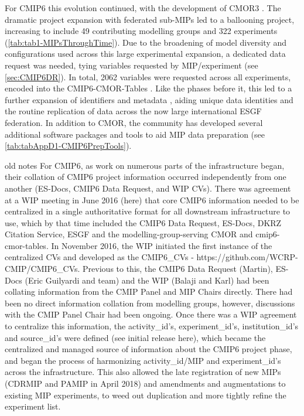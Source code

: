 \documentclass[gmd, preprint]{copernicus}
\begin{document}
{For CMIP6 this evolution continued, with the development of CMOR3 \citep{mauzey_cmor_2024}. The dramatic project expansion with federated sub-MIPs led to a ballooning project, increasing to include 49 contributing modelling groups and 322 experiments (\autoref{tab:tab1-MIPsThroughTime}). Due to the broadening of model diversity and configurations used across this large experimental expansion, a dedicated data request was needed, tying variables requested by MIP/experiment (see \autoref{sec:CMIP6DR}). In total, 2062 variables were requested across all experiments, encoded into the CMIP6-CMOR-Tables \citep{nadeau_cmip6_2017}. Like the phases before it, this led to a further expansion of identifiers and metadata \citep{taylor_pcmdi_2018}, aiding unique data identities and the routine replication of data across the now large international ESGF federation. In addition to CMOR, the community has developed several additional software packages and tools to aid MIP data preparation (see \autoref{tab:tabAppD1-CMIP6PrepTools}).

old notes
For CMIP6, as work on numerous parts of the infrastructure began, their collation of CMIP6 project information occurred independently from one another (ES-Docs, CMIP6 Data Request, and WIP CVs). There was agreement at a WIP meeting in June 2016 (here) that core CMIP6 information needed to be centralized in a single authoritative format for all downstream infrastructure to use, which by that time included the CMIP6 Data Request, ES-Docs, DKRZ Citation Service, ESGF and the modelling-group-serving CMOR and cmip6-cmor-tables. In November 2016, the WIP initiated the first instance of the centralized CVs and developed as the CMIP6_CVs - https://github.com/WCRP-CMIP/CMIP6_CVs. Previous to this, the CMIP6 Data Request (Martin), ES-Docs (Eric Guilyardi and team) and the WIP (Balaji and Karl) had been collating information from the CMIP Panel and MIP Chairs directly. There had been no direct information collation from modelling groups, however, discussions with the CMIP Panel Chair had been ongoing. Once there was a WIP agreement to centralize this information, the activity_id’s, experiment_id’s, institution_id’s and source_id’s were defined (see initial release here), which became the centralized and managed source of information about the CMIP6 project phase, and began the process of harmonizing activity_id/MIP and experiment_id’s across the infrastructure. This also allowed the late registration of new MIPs (CDRMIP and PAMIP in April 2018) and amendments and augmentations to existing MIP experiments, to weed out duplication and more tightly refine the experiment list.

}
\end{document}
